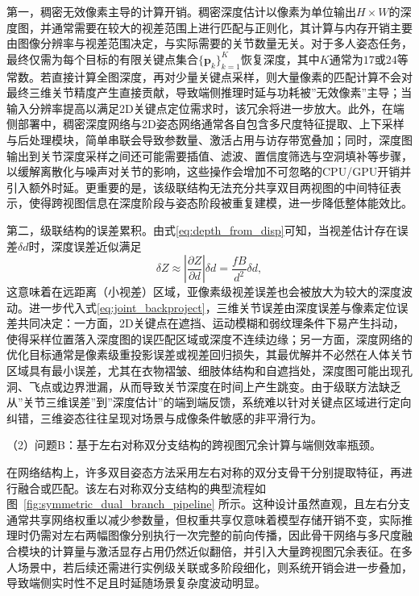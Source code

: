 第一，稠密无效像素主导的计算开销。稠密深度估计以像素为单位输出$H\times W$的深度图，并通常需要在较大的视差范围上进行匹配与正则化，其计算与内存开销主要由图像分辨率与视差范围决定，与实际需要的关节数量无关。对于多人姿态任务，最终仅需为每个目标的有限关键点集合$\{\mathbf{p}_k\}_{k=1}^{K}$恢复深度，其中$K$通常为$17$或$24$等常数。若直接计算全图深度，再对少量关键点采样，则大量像素的匹配计算不会对最终三维关节精度产生直接贡献，导致端侧推理时延与功耗被”无效像素”主导；当输入分辨率提高以满足2D关键点定位需求时，该冗余将进一步放大。此外，在端侧部署中，稠密深度网络与2D姿态网络通常各自包含多尺度特征提取、上下采样与后处理模块，简单串联会导致参数量、激活占用与访存带宽叠加；同时，深度图输出到关节深度采样之间还可能需要插值、滤波、置信度筛选与空洞填补等步骤，以缓解离散化与噪声对关节的影响，这些操作会增加不可忽略的CPU/GPU开销并引入额外时延。更重要的是，该级联结构无法充分共享双目两视图的中间特征表示，使得跨视图信息在深度阶段与姿态阶段被重复建模，进一步降低整体能效比。

第二，级联结构的误差累积。由式\eqref{eq:depth_from_disp}可知，当视差估计存在误差$\delta d$时，深度误差近似满足
\begin{equation}
\delta Z \approx \left|\frac{\partial Z}{\partial d}\right|\delta d = \frac{fB}{d^2}\delta d,
\label{eq:depth_error_propagation}
\end{equation}
这意味着在远距离（小视差）区域，亚像素级视差误差也会被放大为较大的深度波动。进一步代入式\eqref{eq:joint_backproject}，三维关节误差由深度误差与像素定位误差共同决定：一方面，2D关键点在遮挡、运动模糊和弱纹理条件下易产生抖动，使得采样位置落入深度图的误匹配区域或深度不连续边缘；另一方面，深度网络的优化目标通常是像素级重投影误差或视差回归损失，其最优解并不必然在人体关节区域具有最小误差，尤其在衣物褶皱、细肢体结构和自遮挡处，深度图可能出现孔洞、飞点或边界泄漏，从而导致关节深度在时间上产生跳变。由于级联方法缺乏从”关节三维误差”到”深度估计”的端到端反馈，系统难以针对关键点区域进行定向纠错，三维姿态往往呈现对场景与成像条件敏感的非平滑行为。

（2）问题B：基于左右对称双分支结构的跨视图冗余计算与端侧效率瓶颈。

在网络结构上，许多双目姿态方法采用左右对称的双分支骨干分别提取特征，再进行融合或匹配。该左右对称双分支结构的典型流程如图~\ref{fig:symmetric_dual_branch_pipeline} 所示。这种设计虽然直观，且左右分支通常共享网络权重以减少参数量，但权重共享仅意味着模型存储开销不变，实际推理时仍需对左右两幅图像分别执行一次完整的前向传播，因此骨干网络与多尺度融合模块的计算量与激活显存占用仍然近似翻倍，并引入大量跨视图冗余表征。在多人场景中，若后续还需进行实例级关联或多阶段细化，则系统开销会进一步叠加，导致端侧实时性不足且时延随场景复杂度波动明显。

